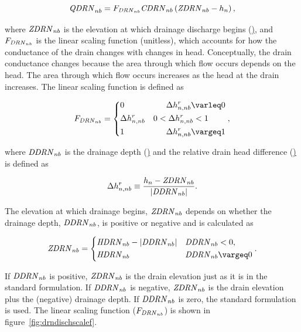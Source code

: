 \begin{equation}
	\label{eqn:bcdrnqoutalt0}
	\mathit{QDRN}_{nb} = F_{\mathit{DRN}_{nb}} \mathit{CDRN}_{nb} \left( \mathit{ZDRN}_{nb} - h_{n} \right) ,
\end{equation}

\noindent where $\mathit{ZDRN}_{nb}$ is the elevation at which drainage discharge begins (\ul), and $F_{\mathit{DRN}_{nb}}$ is the linear scaling function (unitless), which accounts for how the conductance of the drain changes with changes in head. Conceptually, the drain conductance changes because the area through which flow occurs depends on the head. The area through which flow occurs increases as the head at the drain increases. The linear scaling function is defined as

\begin{equation}
	\begin{aligned}
		\label{eqn:bcdrnFC}
		F_{\mli{DRN}_{nb}} = \begin{dcases} 
			0 &\phantom{0 <} \Delta h_{n,nb}^{r} \le 0 \\
			\Delta h_{n,nb}^{r}  &0 < \Delta h_{n,nb}^{r} < 1 \\
			1 &\phantom{0 <} \Delta h_{n,nb}^{r} \ge 1
		\end{dcases} ,
	\end{aligned}
\end{equation}

\noindent where $\mathit{DDRN}_{nb}$ is the drainage depth (\ul) and the relative drain head difference (\ul) is defined as

\begin{equation}
	\label{eqn:reldrainheaddiff}
	\Delta h_{n,nb}^{r} \equiv \frac{h_n - \mathit{ZDRN}_{nb}}{\left| \mathit{DDRN}_{nb} \right|} .
\end{equation}

\noindent The elevation at which drainage begins, $\mathit{ZDRN}_{nb}$ depends on whether the drainage depth, $\mathit{DDRN}_{nb}$, is positive or negative and is calculated as

\begin{align}
	\label{eqn:bcdrnZDRN}
	\mli{ZDRN}_{nb} = \begin{dcases}
		\mli{HDRN}_{nb} - \left| \mli{DDRN}_{nb} \right| &\mli{DDRN}_{nb} < 0, \\
		\mli{HDRN}_{nb} &\mli{DDRN}_{nb} \ge 0
    	\end{dcases} .
\end{align}

\noindent If $\mathit{DDRN}_{nb}$ is positive, $\mathit{ZDRN}_{nb}$ is the drain elevation just as it is in the standard formulation. If $\mathit{DDRN}_{nb}$ is negative, $\mathit{ZDRN}_{nb}$ is the drain elevation plus the (negative) drainage depth. If $\mathit{DDRN}_{nb}$ is zero, the standard formulation is used. The linear scaling function ($F_{\mathit{DRN}_{nb}}$) is shown in figure~\ref{fig:drndischscalef}.

